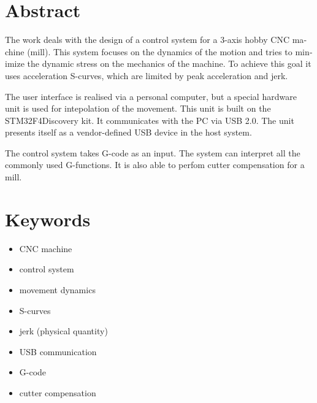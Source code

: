 \begin{otherlanguage}{english}

\section*{Abstract}\label{AbstraktEN}

\begin{spacing}{1.3}
	The work deals with the design of a control system for a 3-axis hobby CNC machine (mill). This system focuses on the dynamics of the motion and tries to minimize the dynamic stress on the mechanics of the machine. To achieve this goal it uses acceleration S-curves, which are limited by peak acceleration and jerk.
	
	The user interface is realised via a personal computer, but a special hardware unit is used for intepolation of the movement. This unit is built on the STM32F4Discovery kit. It communicates with the PC via USB 2.0. The unit presents itself as a vendor-defined USB device in the host system.
	
	The control system takes G-code as an input. The system can interpret all the commonly used G-functions. It is also able to perfom cutter compensation for a mill.

\end{spacing}

\section*{Keywords}

\begin{itemize}
	\item CNC machine
	\item control system
	\item movement dynamics
	\item S-curves
	\item jerk (physical quantity)
	\item USB communication
	\item G-code
	\item cutter compensation
\end{itemize}

\end{otherlanguage}

\renewcommand{\labelitemi}{\textbullet}